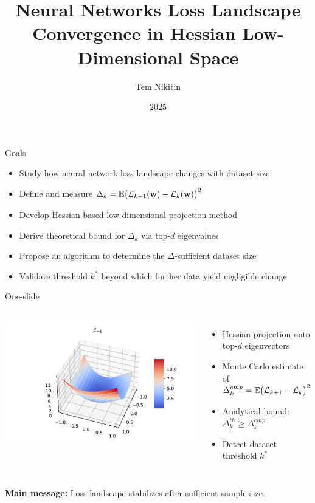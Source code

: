 \documentclass{beamer}
\title[Loss Landscape Convergence]{Neural Networks Loss Landscape Convergence in Hessian Low-Dimensional Space}
\author[Tem Nikitin \textit{et al.}]{Tem Nikitin}
\institute{Moscow Institute of Physics and Technology}
\date{2025}
\begin{document}
\begin{frame}
    \thispagestyle{empty}
    \maketitle
\end{frame}

\begin{frame}{Goals}
    \begin{itemize}
        \item Study how neural network loss landscape changes with dataset size
        \item Define and measure $\Delta_k = \mathbb{E}\bigl(\mathcal{L}_{k+1}(\mathbf{w}) - \mathcal{L}_k(\mathbf{w})\bigr)^2$
        \item Develop Hessian-based low-dimensional projection method
        \item Derive theoretical bound for $\Delta_k$ via top-$d$ eigenvalues
        \item Propose an algorithm to determine the $\Delta$-sufficient dataset size
        \item Validate threshold $k^*$ beyond which further data yield negligible change
    \end{itemize}
\end{frame}

\begin{frame}{One-slide}
    \begin{columns}[c]
        \hspace{-1.5cm}
        \includegraphics[width=1.2\textwidth]{img/loss_eigen_-1_individ.pdf}
        \begin{itemize}
            \item Hessian projection onto top-$d$ eigenvectors
            \item Monte Carlo estimate of $\Delta_k^{emp} = \mathbb{E}\bigl(\mathcal{L}_{k+1} - \mathcal{L}_{k}\bigr)^2$
            \item Analytical bound: $\Delta_k^{th} \ge \Delta_k^{emp}$
            \item Detect dataset threshold $k^*$
        \end{itemize}
    \end{columns}
    \bigskip
    \textbf{Main message:} Loss landscape stabilizes after sufficient sample size.
\end{frame}
\end{document}
